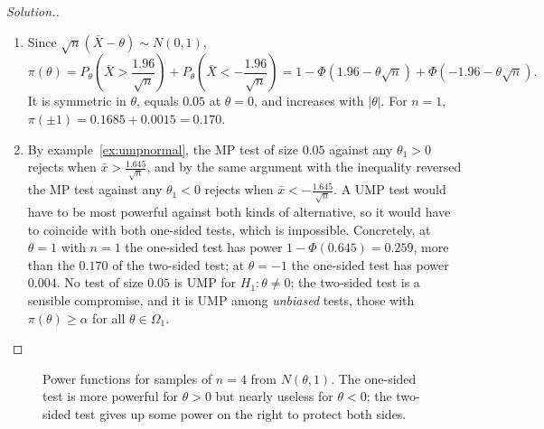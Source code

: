 \documentclass[12pt,a4paper]{report}
\theoremstyle{definition}
\theoremstyle{plain}
\newenvironment{solution}
  {\renewcommand{\qedsymbol}{}\begin{proof}[\textit{Solution}.]}
  {\end{proof}}
\begin{document}
\begin{solution}
\begin{enumerate}
\item[(a)] Since $\sqrt n(\bar X - \theta)\sim N(0,1)$,
\[\pi(\theta) = P_\theta\left(\bar X>\frac{1.96}{\sqrt n}\right)
+ P_\theta\left(\bar X<-\frac{1.96}{\sqrt n}\right)
= 1 - \Phi(1.96 - \theta\sqrt n) + \Phi(-1.96 - \theta\sqrt n).\]
It is symmetric in $\theta$, equals $0.05$ at $\theta = 0$, and increases with
$|\theta|$. For $n = 1$, $\pi(\pm1) = 0.1685 + 0.0015 = 0.170$.
\item[(b)] By example~\ref{ex:umpnormal}, the MP test of size $0.05$ against any
$\theta_1>0$ rejects when $\bar x>\frac{1.645}{\sqrt n}$, and by the same
argument with the inequality reversed the MP test against any $\theta_1<0$
rejects when $\bar x<-\frac{1.645}{\sqrt n}$. A UMP test would have to be most
powerful against both kinds of alternative, so it would have to coincide with
both one-sided tests, which is impossible. Concretely, at $\theta = 1$ with
$n = 1$ the one-sided test has power $1 - \Phi(0.645) = 0.259$, more than the
$0.170$ of the two-sided test; at $\theta = -1$ the one-sided test has power
$0.004$. No test of size $0.05$ is UMP for $H_1\colon\theta\ne 0$; the two-sided
test is a sensible compromise, and it is UMP among \emph{unbiased} tests, those
with $\pi(\theta)\ge\alpha$ for all $\theta\in\Omega_1$.
\end{enumerate}
\end{solution}

\begin{figure}[H]
\centering
{}
\caption{Power functions for samples of $n = 4$ from $N(\theta,1)$. The one-sided
test is more powerful for $\theta>0$ but nearly useless for $\theta<0$; the
two-sided test gives up some power on the right to protect both sides.}
\label{fig:twosided}
\end{figure}
\end{document}
